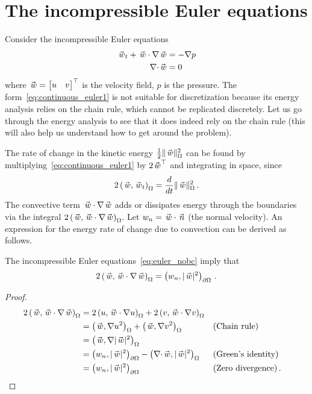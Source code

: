 \section{The incompressible Euler equations}%
\label{sec:euler}
Consider the incompressible Euler equations
\begin{subequations}%
\label{eq:euler_nobc}
  \begin{align}
    \wc_t + \wc \cdot \nabla \wc &= -\nabla p \label{eq:continuous_euler1} \\
    \div \wc &= 0 \label{eq:div_zero}
  \end{align}
\end{subequations}
where
$
  \wc =
  \begin{bmatrix}
    \uc & \vc
  \end{bmatrix}^\top
$
is the velocity field, $p$ is the pressure. The form~\eqref{eq:continuous_euler1} is not suitable for discretization because its energy analysis relies on the chain rule, which cannot be replicated discretely. Let us go through the energy analysis to see that it does indeed rely on the chain rule (this will also help us understand how to get around the problem).

The rate of change in the kinetic energy $\frac{1}{2}\normc{\wc}^2$ can be found by multiplying~\eqref{eq:continuous_euler1} by $2\wc^\top$ and integrating in space, since
\[
  2\ipc{\wc}{\wc_t} = \frac{d}{dt} \|\wc\|_\Omega^2 \,.
\]
The convective term $\wc \cdot \nabla \wc$ adds or dissipates energy through the boundaries via the integral
$
  2\ipc{\wc}{\wc \cdot \nabla \wc}
$.
Let $\wcn = \wc \cdot \nc$ (the normal velocity). An expression for the energy rate of change due to convection can be derived as follows.
\begin{lemma}\label{lemma:convection1}
  The incompressible Euler equations~\eqref{eq:euler_nobc} imply that
  \begin{equation*}
    2\ipc{\wc}{\wc \cdot \nabla \wc} = \ipbc{\wcn}{|\wc|^2} \,.
  \end{equation*}
\end{lemma}
\begin{proof}
  \begin{align*}
    2\ipc{\wc}{\wc \cdot \nabla \wc}
      &= 2\ipc{u}{\wc \cdot \nabla u} + 2\ipc{v}{\wc \cdot \nabla v} \\
      &= \ipc{\wc}{\nabla u^2} + \ipc{\wc}{\nabla v^2} &&\text{(Chain rule)} \\
      &= \ipc{\wc}{\nabla |\wc|^2} \\
      &= \ipbc{\wcn}{|\wc|^2} - \ipc{\div \wc}{|\wc|^2} &&\text{(Green's identity)} \\
      &= \ipbc{\wcn}{|\wc|^2} &&\text{(Zero divergence)}\,.
  \end{align*}
\end{proof}

